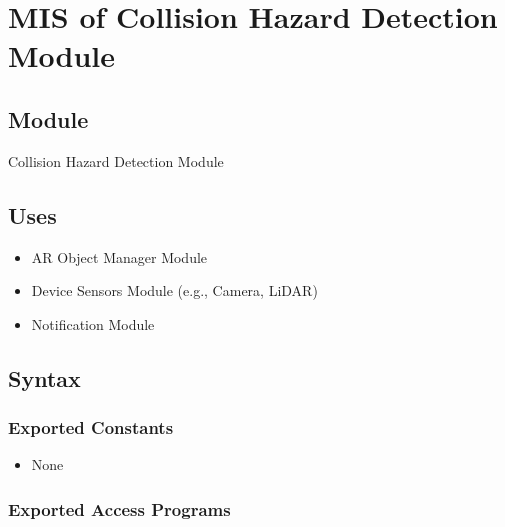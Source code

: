 \documentclass[12pt, titlepage]{article}
\begin{document}
\newpage


\section{MIS of Collision Hazard Detection Module} \label{Module_CollisionHazardDetection}

\subsection{Module}

Collision Hazard Detection Module

\subsection{Uses}

\begin{itemize}
  \item AR Object Manager Module
  \item Device Sensors Module (e.g., Camera, LiDAR)
  \item Notification Module
\end{itemize}

\subsection{Syntax}

\subsubsection{Exported Constants}

\begin{itemize}
  \item None
\end{itemize}

\subsubsection{Exported Access Programs}
\end{document}
